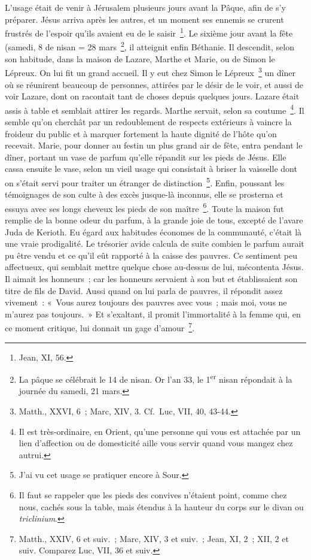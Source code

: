 \documentclass[french,twoside]{book} %
\begin{document}
L’usage était de venir à Jérusalem plusieurs jours avant la Pâque, afin de s’y préparer. Jésus arriva après les autres, et un moment ses ennemis se crurent frustrés de l’espoir qu’ils avaient eu de le saisir \footnote{Jean, XI, 56.}. Le sixième jour avant la fête (samedi, 8 de nisan = 28 mars \footnote{ La pâque se célébrait le 14 de nisan. Or l’an 33, le 1\textsuperscript{er} nisan répondait à la journée du samedi, 21 mars.}, il atteignit enfin Béthanie. Il descendit, selon son habitude, dans la maison de Lazare, Marthe et Marie, ou de Simon le Lépreux. On lui fit un grand accueil. Il y eut chez Simon le Lépreux \footnote{Matth., XXVI, 6 ; Marc, XIV, 3. Cf. Luc, VII, 40, 43-44.} un dîner où se réunirent beaucoup de personnes, attirées par le désir de le voir, et aussi de voir Lazare, dont on racontait tant de choses depuis quelques jours. Lazare était assis à table et semblait attirer les regards. Marthe servait, selon sa coutume \footnote{Il est très-ordinaire, en Orient, qu’une personne qui vous est attachée par un lien d’affection ou de domesticité aille vous servir quand vous mangez chez autrui.}. Il semble qu’on cherchât par un redoublement de respects extérieurs à vaincre la froideur du public et à marquer fortement la haute dignité de l’hôte qu’on recevait. Marie, pour donner au festin un plus grand air de fête, entra pendant le dîner, portant un vase de parfum qu’elle répandit sur les pieds de Jésus. Elle cassa ensuite le vase, selon un vieil usage qui consistait à briser la vaisselle dont on s’était servi pour traiter un étranger de distinction \footnote{J’ai vu cet usage se pratiquer encore à Sour.}. Enfin, poussant les témoignages de son culte à des excès jusque-là inconnus, elle se prosterna et essuya avec ses longs cheveux les pieds de son maître \footnote{ Il faut se rappeler que les pieds des convives n’étaient point, comme chez nous, cachés sous la table, mais étendus à la hauteur du corps sur le divan ou {\itshape triclinium}.}. Toute la maison fut remplie de la bonne odeur du parfum, à la grande joie de tous, excepté de l’avare Juda de Kerioth. Eu égard aux habitudes économes de la communauté, c’était là une vraie prodigalité. Le trésorier avide calcula de suite combien le parfum aurait pu être vendu et ce qu’il eût rapporté à la caisse des pauvres. Ce sentiment peu affectueux, qui semblait mettre quelque chose au-dessus de lui, mécontenta Jésus. Il aimait les honneurs ; car les honneurs servaient à son but et établissaient son titre de fils de David. Aussi quand on lui parla de pauvres, il répondit assez vivement : « Vous aurez toujours des pauvres avec vous ; mais moi, vous ne m’aurez pas toujours. » Et s’exaltant, il promit l’immortalité à la femme qui, en ce moment critique, lui donnait un gage d’amour \footnote{Matth., XXIV, 6 et suiv. ; Marc, XIV, 3 et suiv. ; Jean, XI, 2 ; XII, 2 et suiv. Comparez Luc, VII, 36 et suiv.}.\par
\end{document}
